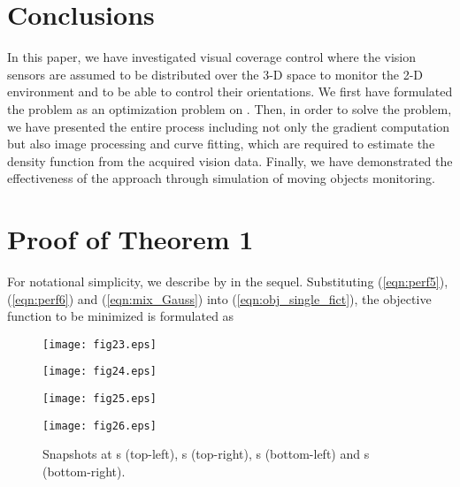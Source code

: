 \documentclass[conference,letterpaper]{ieeeconf}
\begin{document}
\section{Conclusions}


In this paper, we have investigated visual coverage control 
where the vision sensors
are assumed to be distributed over the 3-D space to 
monitor the 2-D environment
and to be able to control their orientations.
We first have formulated the problem as an optimization
problem on .
Then, in order to solve the problem, we have presented
the entire process including not only the gradient computation
but also image processing and curve fitting, which are 
required to estimate the density function
from the acquired vision data.
Finally, we have demonstrated the effectiveness of the approach
through simulation of moving objects monitoring.

\appendix


\section{Proof of Theorem 1}
\label{app:1}



For notational simplicity, we describe  by  in the sequel.
Substituting (\ref{eqn:perf5}), (\ref{eqn:perf6}) and (\ref{eqn:mix_Gauss})
into (\ref{eqn:obj_single_fict}), the objective function to be minimized
is formulated as




\begin{figure}[t]
\begin{center}
\begin{minipage}{4cm}
\begin{center}
\texttt{[image: fig23.eps]}
\end{center}
\end{minipage}
\hspace{.2cm}
\begin{minipage}{4cm}
\begin{center}
\texttt{[image: fig24.eps]}
\end{center}
\end{minipage}
\medskip

\begin{minipage}{4cm}
\begin{center}
\texttt{[image: fig25.eps]}
\end{center}
\end{minipage}
\hspace{.2cm}
\begin{minipage}{4cm}
\begin{center}
\texttt{[image: fig26.eps]}
\end{center}
\end{minipage}
\caption{Snapshots at s (top-left), s (top-right), s (bottom-left) and s (bottom-right).}
\label{fig:snaps}
\end{center}
\end{figure}
\end{document}
